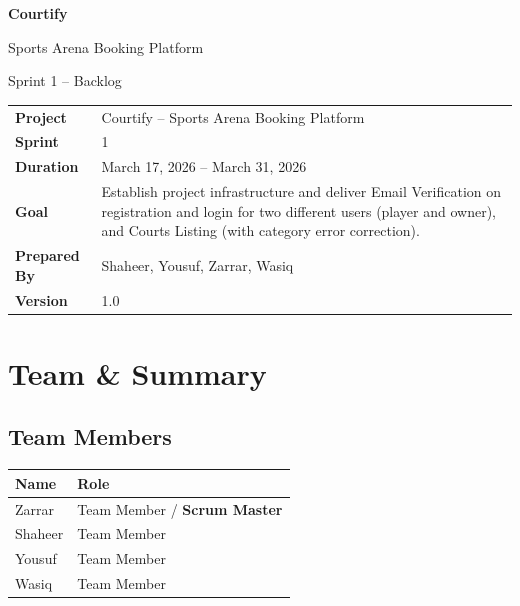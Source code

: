 \documentclass[12pt,a4paper]{article}
\begin{document}

\begin{titlepage}
\centering
\vspace*{2cm}
{\Huge\bfseries\color{sectionblue} Courtify}\par
\vspace{0.4cm}
{\Large Sports Arena Booking Platform}\par
\vspace{1.5cm}
{\huge Sprint 1 -- Backlog}\par
\vspace{2cm}
\renewcommand{\arraystretch}{1.5}
\begin{tabular}{>{\bfseries}l p{10cm}}
Project     & Courtify -- Sports Arena Booking Platform \\
Sprint      & 1 \\
Duration    & March 17, 2026 -- March 31, 2026 \\
Goal        & Establish project infrastructure and deliver Email Verification on registration and login for two different users (player and owner), and Courts Listing (with category error correction). \\
Prepared By & Shaheer, Yousuf, Zarrar, Wasiq \\
Version     & 1.0 \\
\end{tabular}
\end{titlepage}

\newpage

\section{Team \& Summary}

\subsection*{Team Members}
\renewcommand{\arraystretch}{1.4}
\begin{tabularx}{\textwidth}{|X|X|}
\hline
\rowcolor{headerbg}\color{white}\bfseries Name & \color{white}\bfseries Role \\ \hline
Zarrar & Team Member / \textbf{Scrum Master} \\ \hline
\rowcolor{rowgray}Shaheer & Team Member \\ \hline
Yousuf & Team Member \\ \hline
\rowcolor{rowgray}Wasiq & Team Member \\ \hline
\end{tabularx}
\end{document}
